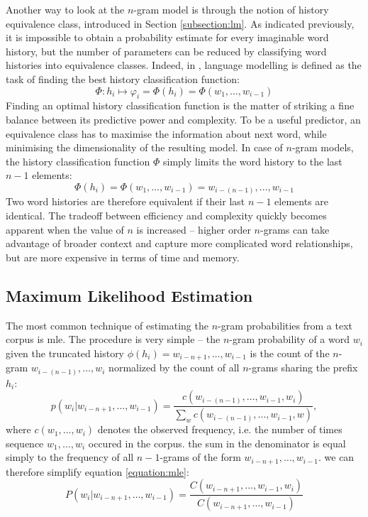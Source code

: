 Another way to look at the $n$-gram model is through the notion of history equivalence class, introduced in Section \ref{subsection:lm}. As indicated previously, it is impossible to obtain a probability estimate for every imaginable word history, but the number of parameters can be reduced by classifying word histories into equivalence classes. Indeed, in \cite{jelinek1997statistical}, language modelling is defined as the task of finding the best history classification function:
\begin{equation}
	\Phi:h_{i}\mapsto\varphi_{i}=\Phi(h_{i})=\Phi(w_{1}, \dots, w_{i-1})
\end{equation}
Finding an optimal history classification function is the matter of striking a fine balance between its predictive power and complexity. To be a useful predictor, an equivalence class has to maximise the information about next word, while minimising the dimensionality of the resulting model. In case of $n$-gram models, the history classification function $\Phi$ simply limits the word history to the last $n-1$ elements:
\begin{equation}
	\Phi(h_{i})=\Phi(w_{1}, \dots, w_{i-1})=w_{i-(n-1)}, \dots, w_{i-1}
\end{equation}
Two word histories are therefore equivalent if their last $n-1$ elements are identical. The tradeoff between efficiency and complexity quickly becomes apparent when the value of $n$ is increased -- higher order $n$-grams can take advantage of broader context and capture more complicated word relationships, but are more expensive in terms of time and memory.
\subsection{Maximum Likelihood Estimation}
\label{subsection:mle}
The most common technique of estimating the $n$-gram probabilities from a text corpus is \gls{mle}. The procedure is very simple -- the $n$-gram probability of a word $w_{i}$ given the truncated history $\phi(h_{i})=w_{i-n+1}, \dots, w_{i-1}$ is the count of the $n$-gram $w_{i-(n-1)}, \dots, w_{i}$ normalized by the count of all $n$-grams sharing the prefix $h_{i}$:
\begin{equation}
	\label{equation:mle}
	p(w_{i}|w_{i-n+1}, \dots, w_{i-1})=\frac{c(w_{i-(n-1)}, \dots, w_{i-1}, w_{i})}{\sum_{w}c(w_{i-(n-1)}, \dots, w_{i-1}, w)},
\end{equation}
where $c(w_{1}, \dots, w_{i})$ denotes the observed frequency, i.e. the number of times sequence $w_{1}, \dots, w_{i}$ occured in the corpus. the sum in the denominator is equal simply to the frequency of all  $n-1$-grams of the form $w_{i-n+1}, \dots, w_{i-1}$. we can therefore simplify equation \ref{equation:mle}:
\begin{equation}
	\label{equation:mle2}
	P(w_{i}|w_{i-n+1}, \dots, w_{i-1})=\frac{C(w_{i-n+1}, \dots, w_{i-1}, w_{i})}{C(w_{i-n+1}, \dots, w_{i-1})}
\end{equation}

